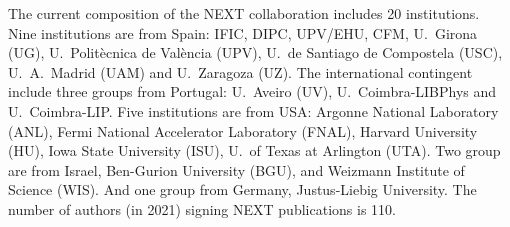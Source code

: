  

 


 \indent
 
The current composition of the NEXT collaboration includes 20 institutions. Nine institutions are from Spain:  IFIC, DIPC,  UPV/EHU, CFM, U.~Girona (UG), U.~Polit\`ecnica de Val\`encia (UPV), U.~de Santiago de Compostela (USC), U.~A.~Madrid (UAM) and U.~Zaragoza (UZ). The international contingent include three groups from Portugal: U.~Aveiro (UV), U.~Coimbra-LIBPhys and U.~Coimbra-LIP. Five institutions are from USA: Argonne National Laboratory (ANL), Fermi National Accelerator Laboratory (FNAL), Harvard University (HU), Iowa State University (ISU), U.~of Texas at Arlington (UTA). Two group are from Israel, Ben-Gurion University (BGU), and Weizmann Institute of Science (WIS). And one group from Germany, Justus-Liebig University. The number of authors (in 2021) signing NEXT publications is 110. 

